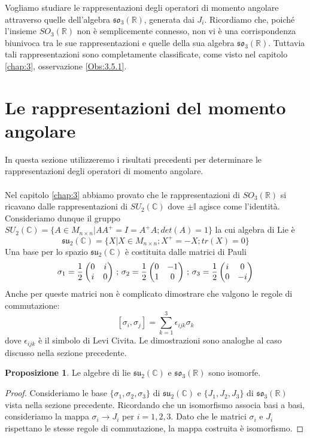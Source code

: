 \documentclass[12pt,a4paper]{report}
\theoremstyle{definition}
\theoremstyle{Theorem}
\newtheorem{Prop}[Def]{Proposizione}
\theoremstyle{definition}
\theoremstyle{definition}
\theoremstyle{definition}
\begin{document}
	Vogliamo studiare le rappresentazioni degli operatori di momento angolare attraverso quelle dell'algebra $\mathfrak{so_3}(\mathbb{R})$, generata dai $J_i$. Ricordiamo che, poiché l'insieme $SO_3(\mathbb{R})$ non è semplicemente connesso, non vi è una corrispondenza biunivoca tra le sue rappresentazioni e quelle della sua algebra $\mathfrak{so_3}(\mathbb{R})$. Tuttavia tali rappresentazioni sono completamente classificate, come visto nel capitolo \ref{chap:3}, osservazione \ref{Obs:3.5.1}.
\section{Le rappresentazioni del momento angolare}
In questa sezione utilizzeremo i risultati precedenti per determinare le rappresentazioni degli operatori di momento angolare.\\
\\
Nel capitolo \ref{chap:3} abbiamo provato che le rappresentazioni di $SO_3(\mathbb{R})$ si ricavano dalle rappresentazioni di $SU_2(\mathbb{C})$ dove $\pm\mathbb{I}$ agisce come l'identità.
Consideriamo dunque il gruppo $SU_2(\mathbb{C})=\{A\in M_{n\times n}|AA^{+}=I=A^{+}A;det(A)=1\}$ la cui algebra di Lie è $$\mathfrak{su_2(\mathbb{C})}=\{X|X\in M_{n\times n} ;X^{+}=-X;tr(X)=0\}$$
Una base per lo spazio $\mathfrak{su_2(\mathbb{C})}$ è costituita dalle matrici di Pauli
$$
\sigma_1={1\over2}\begin{pmatrix}
	0 &i\\
	i &0\\
\end{pmatrix}\,;\,
\sigma_2={1\over2}\begin{pmatrix}
	0 &-1\\
	1 &0\\
\end{pmatrix}\,;\,
\sigma_3={1\over2}\begin{pmatrix}
	i &0\\
	0 &-i\\
\end{pmatrix}
$$
Anche per queste matrici non è complicato dimostrare che valgono le regole di commutazione:
$$[\sigma_i,\sigma_j]=\sum_{k=1}^{3}\epsilon_{ijk}\sigma_k$$ 
dove $\epsilon_{ijk}$ è il simbolo di Levi Civita. Le dimostrazioni sono analoghe al caso discusso nella sezione precedente.
\begin{Prop} \label{Prop:4.3.1}
	Le algebre di lie $\mathfrak{su_2(\mathbb{C})}$ e $\mathfrak{so_3}(\mathbb{R})$ sono isomorfe.
\end{Prop}
\begin{proof}
	Consideriamo le base $\{\sigma_1,\sigma_2,\sigma_3\}$ di $\mathfrak{su_2(\mathbb{C})}$ e $\{J_1,J_2,J_3\}$ di $\mathfrak{so_3}(\mathbb{R})$ vista nella sezione precedente. Ricordando che un isomorfismo associa basi a basi, consideriamo la mappa
	$\sigma_i\rightarrow J_i$ per $i=1,2,3$. Dato che le matrici $\sigma_i$ e $J_i$ rispettano le stesse regole di commutazione, la mappa costruita è isomorfismo.
\end{proof}
\end{document}
